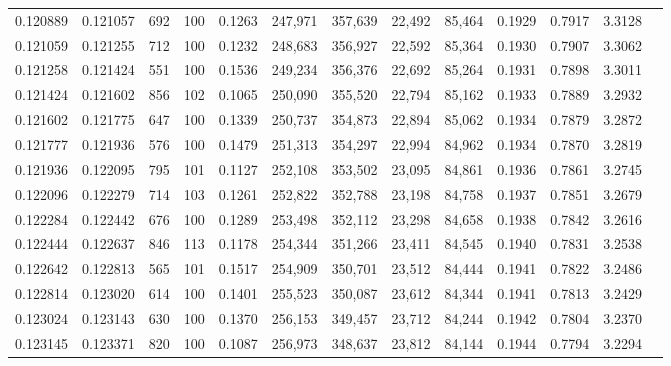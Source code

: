 \begin{tabular}{rrrrrrrrrrrrr}
0.120889 & 0.121057 &   692 & 100 &                                     0.1263 & 247,971 & 357,639 &  22,492 &  85,464 & 0.1929 & 0.7917 & 3.3128 \\
0.121059 & 0.121255 &   712 & 100 &                                     0.1232 & 248,683 & 356,927 &  22,592 &  85,364 & 0.1930 & 0.7907 & 3.3062 \\
0.121258 & 0.121424 &   551 & 100 &                                     0.1536 & 249,234 & 356,376 &  22,692 &  85,264 & 0.1931 & 0.7898 & 3.3011 \\
0.121424 & 0.121602 &   856 & 102 &                                     0.1065 & 250,090 & 355,520 &  22,794 &  85,162 & 0.1933 & 0.7889 & 3.2932 \\
0.121602 & 0.121775 &   647 & 100 &                                     0.1339 & 250,737 & 354,873 &  22,894 &  85,062 & 0.1934 & 0.7879 & 3.2872 \\
0.121777 & 0.121936 &   576 & 100 &                                     0.1479 & 251,313 & 354,297 &  22,994 &  84,962 & 0.1934 & 0.7870 & 3.2819 \\
0.121936 & 0.122095 &   795 & 101 &                                     0.1127 & 252,108 & 353,502 &  23,095 &  84,861 & 0.1936 & 0.7861 & 3.2745 \\
0.122096 & 0.122279 &   714 & 103 &                                     0.1261 & 252,822 & 352,788 &  23,198 &  84,758 & 0.1937 & 0.7851 & 3.2679 \\
0.122284 & 0.122442 &   676 & 100 &                                     0.1289 & 253,498 & 352,112 &  23,298 &  84,658 & 0.1938 & 0.7842 & 3.2616 \\
0.122444 & 0.122637 &   846 & 113 &                                     0.1178 & 254,344 & 351,266 &  23,411 &  84,545 & 0.1940 & 0.7831 & 3.2538 \\
0.122642 & 0.122813 &   565 & 101 &                                     0.1517 & 254,909 & 350,701 &  23,512 &  84,444 & 0.1941 & 0.7822 & 3.2486 \\
0.122814 & 0.123020 &   614 & 100 &                                     0.1401 & 255,523 & 350,087 &  23,612 &  84,344 & 0.1941 & 0.7813 & 3.2429 \\
0.123024 & 0.123143 &   630 & 100 &                                     0.1370 & 256,153 & 349,457 &  23,712 &  84,244 & 0.1942 & 0.7804 & 3.2370 \\
0.123145 & 0.123371 &   820 & 100 &                                     0.1087 & 256,973 & 348,637 &  23,812 &  84,144 & 0.1944 & 0.7794 & 3.2294 \\

\end{tabular}
